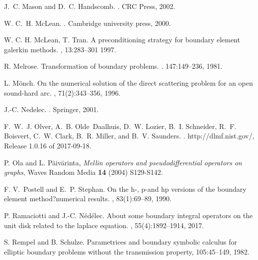 \documentclass[a4paper]{article}
\begin{document}
\begin{thebibliography}{10}
J.~C. Mason and D.~C. Handscomb.
.
\newblock CRC Press, 2002.

W. C.~H. McLean.
.
\newblock Cambridge university press, 2000.

{W. C. H. McLean, T. Tran}.
\newblock A preconditioning strategy for boundary element galerkin methods.
, 13:283--301 1997.

 R. Melrose. Transformation of boundary problems. . 147:149--236, 1981.


L. M{\"o}nch.
\newblock On the numerical solution of the direct scattering problem for an
  open sound-hard arc.
,
  71(2):343--356, 1996.

J.-C. Nedelec. . \newblock Springer, 2001.

F.~W.~J. Olver, A.~B. Olde~Daalhuis, D.~W. Lozier, B.~I. Schneider, R.~F.
  Boisvert, C.~W. Clark, B.~R. Miller, and B.~V. Saunders.
.
\newblock http://dlmf.nist.gov/, Release 1.0.16 of 2017-09-18.

 P. Ola and L. P\"aiv\"arinta, {\em Mellin operators and pseudodifferential operators on graphs}, Waves Random Media {\bf 14} (2004) S129-S142.

F. V.~Postell and E.~P. Stephan.
\newblock On the h-, p-and hp versions of the boundary element
  method?numerical results.
,
  83(1):69--89, 1990.

P. Ramaciotti and J.-C. N{\'e}d{\'e}lec.
\newblock About some boundary integral operators on the unit disk related to
  the laplace equation.
, 55(4):1892--1914, 2017.

 S. Rempel and B. Schulze. \newblock Parametrices and boundary symbolic calculus for elliptic boundary problems without the transmission property,  105:45--149, 1982.



\end{thebibliography}
\end{document}
